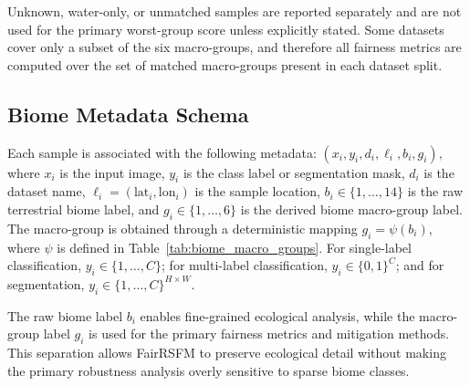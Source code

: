 \documentclass[10pt,twocolumn,letterpaper]{article}
\newcommand{\method}{FairRSFM\xspace}
\begin{document}

Unknown, water-only, or unmatched samples are reported separately and are not used for the primary worst-group score unless explicitly stated. Some datasets cover only a subset of the six macro-groups, and therefore all fairness metrics are computed over the set of matched macro-groups present in each dataset split.


\subsection{Biome Metadata Schema}

Each sample is associated with the following metadata: $(x_i, y_i, d_i, \ell_i, b_i, g_i),$ where \(x_i\) is the input image, \(y_i\) is the class label or segmentation mask, \(d_i\) is the dataset name, \(\ell_i=(\mathrm{lat}_i,\mathrm{lon}_i)\) is the sample location, \(b_i\in\{1,\ldots,14\}\) is the raw terrestrial biome label, and \(g_i\in\{1,\ldots,6\}\) is the derived biome macro-group label. The macro-group is obtained through a deterministic mapping \(g_i=\psi(b_i)\), where \(\psi\) is defined in Table~\ref{tab:biome_macro_groups}. For single-label classification, \(y_i\in\{1,\ldots,C\}\); for multi-label classification, \(y_i\in\{0,1\}^{C}\); and for segmentation, \(y_i \in \{1,\ldots,C\}^{H\times W}\).

The raw biome label \(b_i\) enables fine-grained ecological analysis, while the macro-group label \(g_i\) is used for the primary fairness metrics and mitigation methods. This separation allows \method to preserve ecological detail without making the primary robustness analysis overly sensitive to sparse biome classes.


\end{document}
